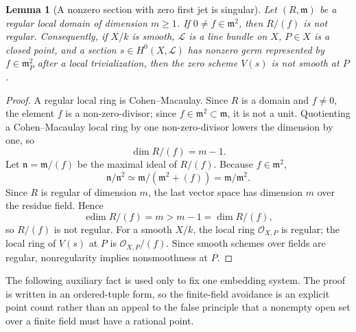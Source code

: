 \documentclass{lms}
\newtheorem{lemma}[theorem]{Lemma}
\DeclareMathOperator{\edim}{edim}
\newcommand{\OO}{\mathcal O}
\begin{document}
\begin{lemma}[A nonzero section with zero first jet is singular]\label{lem:first-order-singular}
Let $(R,\mathfrak m)$ be a regular local domain of dimension $m\ge1$.  If $0\ne f\in\mathfrak m^2$, then $R/(f)$ is not regular.  Consequently, if $X/k$ is smooth, $\mathcal L$ is a line bundle on $X$, $P\in X$ is a closed point, and a section $s\in H^0(X,\mathcal L)$ has nonzero germ represented by $f\in\mathfrak m_P^2$ after a local trivialization, then the zero scheme $V(s)$ is not smooth at $P$.
\end{lemma}

\begin{proof}
A regular local ring is Cohen--Macaulay.  Since $R$ is a domain and $f\ne0$, the element $f$ is a non-zero-divisor; since $f\in\mathfrak m^2\subset\mathfrak m$, it is not a unit.  Quotienting a Cohen--Macaulay local ring by one non-zero-divisor lowers the dimension by one, so
\[
        \dim R/(f)=m-1.
\]
Let $\mathfrak n=\mathfrak m/(f)$ be the maximal ideal of $R/(f)$.  Because $f\in\mathfrak m^2$,
\[
        \mathfrak n/\mathfrak n^2
        \simeq
        \mathfrak m/(\mathfrak m^2+(f))
        =
        \mathfrak m/\mathfrak m^2.
\]
Since $R$ is regular of dimension $m$, the last vector space has dimension $m$ over the residue field.  Hence
\[
        \edim R/(f)=m>m-1=\dim R/(f),
\]
so $R/(f)$ is not regular.  For a smooth $X/k$, the local ring $\OO_{X,P}$ is regular; the local ring of $V(s)$ at $P$ is $\OO_{X,P}/(f)$.  Since smooth schemes over fields are regular, nonregularity implies nonsmoothness at $P$.
\end{proof}



The following auxiliary fact is used only to fix one embedding system.  The proof is written in an ordered-tuple form, so the finite-field avoidance is an explicit point count rather than an appeal to the false principle that a nonempty open set over a finite field must have a rational point.
\end{document}
